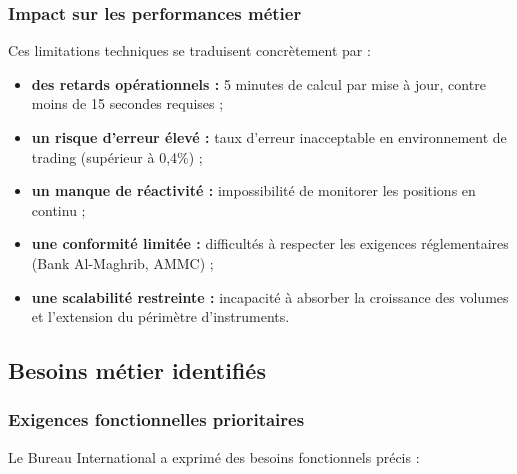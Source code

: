 \subsubsection{Impact sur les performances métier}

\hspace{1cm} Ces limitations techniques se traduisent concrètement par :

\begin{itemize}
    \item \textbf{des retards opérationnels :} 5 minutes de calcul par mise à jour, contre moins de 15 secondes requises ;
    \item \textbf{un risque d'erreur élevé :} taux d'erreur inacceptable en environnement de trading (supérieur à 0,4\%) ;
    \item \textbf{un manque de réactivité :} impossibilité de monitorer les positions en continu ;
    \item \textbf{une conformité limitée :} difficultés à respecter les exigences réglementaires (Bank Al-Maghrib, AMMC) ;
    \item \textbf{une scalabilité restreinte :} incapacité à absorber la croissance des volumes et l'extension du périmètre d'instruments.
\end{itemize}

\subsection{Besoins métier identifiés}

\subsubsection{Exigences fonctionnelles prioritaires}

\hspace{1cm} Le Bureau International a exprimé des besoins fonctionnels précis :

